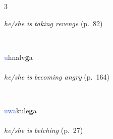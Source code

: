 \documentclass[oneside,openany]{book}%
\begin{document}
\begin{multicols}{3}
\begin{minipage}[t]{\linewidth}
\noindent \textit{he/she is taking revenge} (p.~82)
\end{minipage}\\[1em]%
\begin{minipage}[t]{\linewidth}
\raggedright\noindent \textcolor{RoyalBlue}{u}hnalv\textbf{g}a\\
\\
\noindent \textit{he/she is becoming angry} (p.~164)
\end{minipage}\\[1em]%
\begin{minipage}[t]{\linewidth}
\raggedright\noindent \textcolor{RoyalBlue}{uwa}kule\textbf{g}a\\
\\
\noindent \textit{he/she is belching} (p.~27)
\end{minipage}\\[1em]%
\end{multicols}%
\vspace{1em}%
\needspace{1.5in}%
\end{document}
